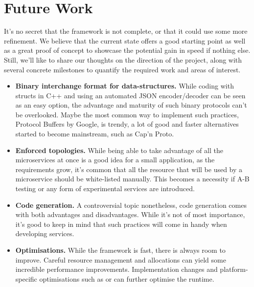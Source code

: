 \section{Future Work}
It’s no secret that the framework is not complete, or that it could use some more refinement. We believe that the current state offers a good starting point as well as a great proof of concept to showcase the potential gain in speed if nothing else. Still, we’ll like to share our thoughts on the direction of the project, along with several concrete milestones to quantify the required work and areas of interest.

\begin{itemize}
\item \textbf{Binary interchange format for data-structures.} While coding with structs in C++ and using an automated JSON encoder/decoder can be seen as an easy option, the advantage and maturity of such binary protocols can’t be overlooked. Maybe the most common way to implement such practices, Protocol Buffers by Google, is trendy, a lot of good and faster alternatives started to become mainstream, such as Cap’n Proto.

\item \textbf{Enforced topologies.} While being able to take advantage of all the microservices at once is a good idea for a small application, as the requirements grow, it’s common that all the resource that will be used by a microservice should be white-listed manually. This becomes a necessity if A-B testing or any form of experimental services are introduced.

\item \textbf{Code generation.} A controversial topic nonetheless, code generation comes with both advantages and disadvantages. While it’s not of most importance, it’s good to keep in mind that such practices will come in handy when developing services.

\item \textbf{Optimisations.} While the framework is fast, there is always room to improve. Careful resource management and allocations can yield some incredible performance improvements. Implementation changes and platform-specific optimisations such as  or  can further optimise the runtime.
\end{itemize}